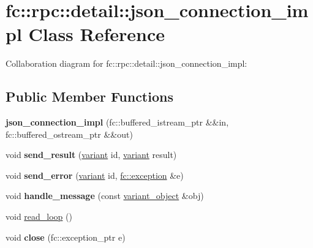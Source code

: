 \hypertarget{classfc_1_1rpc_1_1detail_1_1json__connection__impl}{}\section{fc\+:\+:rpc\+:\+:detail\+:\+:json\+\_\+connection\+\_\+impl Class Reference}
\label{classfc_1_1rpc_1_1detail_1_1json__connection__impl}


Collaboration diagram for fc\+:\+:rpc\+:\+:detail\+:\+:json\+\_\+connection\+\_\+impl\+:
\subsection*{Public Member Functions}
\begin{DoxyCompactItemize}
\item 
\mbox{\label{classfc_1_1rpc_1_1detail_1_1json__connection__impl_acbe511cabf9ceafd86b6a8e285ce1f44}} 
{\bfseries json\+\_\+connection\+\_\+impl} (fc\+::buffered\+\_\+istream\+\_\+ptr \&\&in, fc\+::buffered\+\_\+ostream\+\_\+ptr \&\&out)
\item 
\mbox{\label{classfc_1_1rpc_1_1detail_1_1json__connection__impl_a454c2f957a6af9582d77b90c3a83152d}} 
void {\bfseries send\+\_\+result} (\mbox{\hyperlink{classfc_1_1variant}{variant}} id, \mbox{\hyperlink{classfc_1_1variant}{variant}} result)
\item 
\mbox{\label{classfc_1_1rpc_1_1detail_1_1json__connection__impl_a0ce34fcde82833ce525270139ad54616}} 
void {\bfseries send\+\_\+error} (\mbox{\hyperlink{classfc_1_1variant}{variant}} id, \mbox{\hyperlink{classfc_1_1exception}{fc\+::exception}} \&e)
\item 
\mbox{\label{classfc_1_1rpc_1_1detail_1_1json__connection__impl_a58192d095a42c85d00b93915198c16cc}} 
void {\bfseries handle\+\_\+message} (const \mbox{\hyperlink{classfc_1_1variant__object}{variant\+\_\+object}} \&obj)
\item 
void \mbox{\hyperlink{classfc_1_1rpc_1_1detail_1_1json__connection__impl_a0f5c981d6620a6a6a3c659aa3a6a23e4}{read\+\_\+loop}} ()
\item 
\mbox{\label{classfc_1_1rpc_1_1detail_1_1json__connection__impl_a87c7bbd0a91e207b0034d611bc9b3356}} 
void {\bfseries close} (fc\+::exception\+\_\+ptr e)
\end{DoxyCompactItemize}
